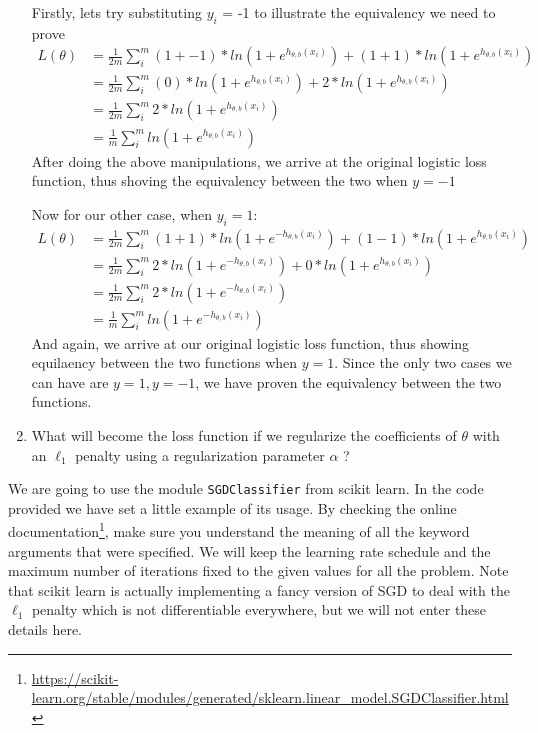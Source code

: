 \documentclass{article}
\begin{document}
\begin{enumerate}
    Firstly, lets try substituting $y_i$ = -1 to illustrate the equivalency we need to prove
    \begin{equation}
        \begin{split}
            L(\theta) &= \frac{1}{2m}\sum_i^{m}(1+-1)*ln(1 +e^{h_{\theta, b}(x_i)}) + (1+1)*ln(1+ e^{h_{\theta, b}(x_i)}) \\
            &=  \frac{1}{2m}\sum_i^{m}(0)*ln(1 +e^{h_{\theta, b}(x_i)}) + 2*ln(1+e^{h_{\theta, b}(x_i)}) \\
            &= \frac{1}{2m}\sum_i^{m} 2*ln(1+e^{h_{\theta, b}(x_i)}) \\
         &= \frac{1}{m}\sum_i^{m} ln(1+e^{h_{\theta, b}(x_i)})
        \end{split}
    \end{equation}
    After doing the above manipulations, we arrive at the original logistic loss function, thus shoving the equivalency between the two when $y = -1$
    
    Now for our other case, when $y_i = 1$: 
    \begin{equation}
        \begin{split}
            L(\theta) &= \frac{1}{2m}\sum_i^{m}(1+1)*ln(1 +e^{-h_{\theta, b}(x_i)}) + (1-1)*ln(1+ e^{h_{\theta, b}(x_i)}) \\
    &= \frac{1}{2m}\sum_i^{m}2*ln(1 +e^{-h_{\theta, b}(x_i)}) + 0*ln(1+e^{h_{\theta, b}(x_i)}) \\
    &= \frac{1}{2m}\sum_i^{m}2*ln(1 +e^{-h_{\theta, b}(x_i)}) \\
    &= \frac{1}{m}\sum_i^{m} ln(1+e^{-h_{\theta, b}(x_i)})
        \end{split}
    \end{equation}
     And again, we arrive at our original logistic loss function, thus showing equilaency between the two functions when $y=1$. Since the only two cases we can have are $y=1,y=-1$, we have proven the equivalency between the two functions.
  \item What will become the loss function if we regularize the coefficients of $\theta$ with an $\ell_1$ penalty using a regularization parameter $\alpha$ ?
  

\setcounter{saveenum}{\value{enumi}}
\end{enumerate}

We are going to use the module \texttt{SGDClassifier} from scikit learn. In the code provided we have set a little example of its usage. By checking the online documentation\footnote{\url{https://scikit-learn.org/stable/modules/generated/sklearn.linear_model.SGDClassifier.html}}, make sure you understand the meaning of all the keyword arguments that were specified. We will keep the learning rate schedule and the maximum number of iterations fixed to the given values for all the problem. Note that scikit learn is actually implementing a fancy version of SGD to deal with the $\ell_1$ penalty which is not differentiable everywhere, but we will not enter these details here.
\end{document}
